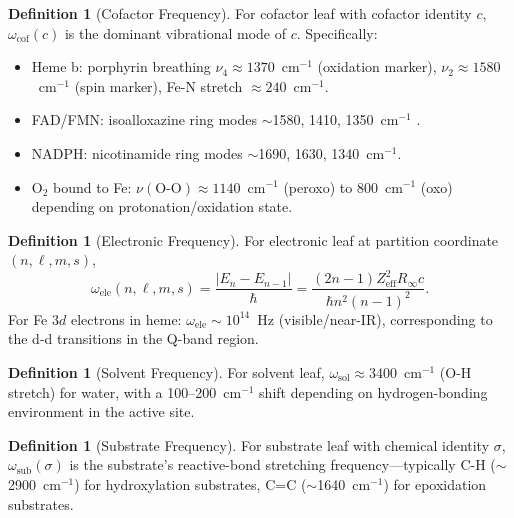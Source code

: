 \documentclass[11pt,twocolumn,a4paper]{article}
\theoremstyle{definition}
\newtheorem{definition}[theorem]{Definition}
\theoremstyle{remark}
\begin{document}
\begin{definition}[Cofactor Frequency]
\label{def:cof_freq}
For cofactor leaf with cofactor identity $c$, $\omega_{\mathrm{cof}}(c)$ is the dominant vibrational mode of $c$. Specifically:
\begin{itemize}[nosep]
    \item Heme b: porphyrin breathing $\nu_4 \approx 1370$~cm$^{-1}$ (oxidation marker), $\nu_2 \approx 1580$~cm$^{-1}$ (spin marker), Fe-N stretch $\approx 240$~cm$^{-1}$.
    \item FAD/FMN: isoalloxazine ring modes $\sim$1580, 1410, 1350~cm$^{-1}$ \citep{abe2002}.
    \item NADPH: nicotinamide ring modes $\sim$1690, 1630, 1340~cm$^{-1}$.
    \item O$_2$ bound to Fe: $\nu(\mathrm{O\text{-}O}) \approx 1140$~cm$^{-1}$ (peroxo) to 800~cm$^{-1}$ (oxo) depending on protonation/oxidation state.
\end{itemize}
\end{definition}

\begin{definition}[Electronic Frequency]
\label{def:ele_freq}
For electronic leaf at partition coordinate $(n, \ell, m, s)$,
\begin{equation}
\omega_{\mathrm{ele}}(n, \ell, m, s) = \frac{|E_n - E_{n-1}|}{\hbar} = \frac{(2n - 1) Z_{\mathrm{eff}}^2 R_\infty c}{\hbar n^2 (n-1)^2}.
\end{equation}
For Fe $3d$ electrons in heme: $\omega_{\mathrm{ele}} \sim 10^{14}$~Hz (visible/near-IR), corresponding to the d-d transitions in the Q-band region.
\end{definition}

\begin{definition}[Solvent Frequency]
\label{def:sol_freq}
For solvent leaf, $\omega_{\mathrm{sol}} \approx 3400$~cm$^{-1}$ (O-H stretch) for water, with a 100--200~cm$^{-1}$ shift depending on hydrogen-bonding environment in the active site.
\end{definition}

\begin{definition}[Substrate Frequency]
\label{def:sub_freq}
For substrate leaf with chemical identity $\sigma$, $\omega_{\mathrm{sub}}(\sigma)$ is the substrate's reactive-bond stretching frequency---typically C-H ($\sim$2900~cm$^{-1}$) for hydroxylation substrates, C=C ($\sim$1640~cm$^{-1}$) for epoxidation substrates.
\end{definition}
\end{document}
